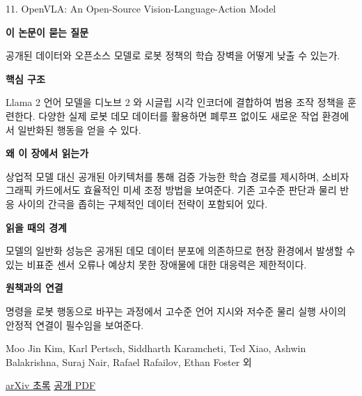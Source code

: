 \documentclass[11pt,openany]{book}
\begin{document}
\begin{termcard}{11. OpenVLA: An Open-Source Vision-Language-Action Model}

\par

\medskip

{\sffamily\bfseries\color{deepblue} 이 논문이 묻는 질문}\par

공개된 데이터와 오픈소스 모델로 로봇 정책의 학습 장벽을 어떻게 낮출 수 있는가.

\smallskip

{\sffamily\bfseries\color{deepblue} 핵심 구조}\par

Llama 2 언어 모델을 디노브 2 와 시글립 시각 인코더에 결합하여 범용 조작 정책을 훈련한다. 다양한 실제 로봇 데모 데이터를 활용하면 폐루프 없이도 새로운 작업 환경에서 일반화된 행동을 얻을 수 있다.

\smallskip

{\sffamily\bfseries\color{deepblue} 왜 이 장에서 읽는가}\par

상업적 모델 대신 공개된 아키텍처를 통해 검증 가능한 학습 경로를 제시하며, 소비자 그래픽 카드에서도 효율적인 미세 조정 방법을 보여준다. 기존 고수준 판단과 물리 반응 사이의 간극을 좁히는 구체적인 데이터 전략이 포함되어 있다.

\smallskip

{\sffamily\bfseries\color{coral} 읽을 때의 경계}\par

모델의 일반화 성능은 공개된 데모 데이터 분포에 의존하므로 현장 환경에서 발생할 수 있는 비표준 센서 오류나 예상치 못한 장애물에 대한 대응력은 제한적이다.

\smallskip

{\sffamily\bfseries\color{teal} 원책과의 연결}\par

명령을 로봇 행동으로 바꾸는 과정에서 고수준 언어 지시와 저수준 물리 실행 사이의 안정적 연결이 필수임을 보여준다.

\medskip

{\footnotesize\color{muted} Moo Jin Kim, Karl Pertsch, Siddharth Karamcheti, Ted Xiao, Ashwin Balakrishna, Suraj Nair, Rafael Rafailov, Ethan Foster 외\par

\href{https://arxiv.org/abs/2406.09246}{arXiv 초록} \quad \href{https://arxiv.org/pdf/2406.09246}{공개 PDF}\par}

\end{termcard}
\end{document}
